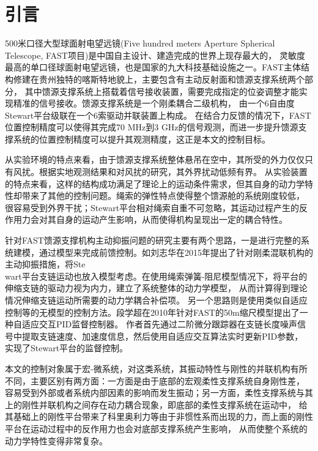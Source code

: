 \section{引言}

500米口径大型球面射电望远镜(Five hundred meters Aperture Spherical Telescope, FAST项目)是中国自主设计、建造完成的世界上现存最大的，
灵敏度最高的单口径球面射电望远镜，也是国家的九大科技基础设施之一。FAST主体结构修建在贵州独特的喀斯特地貌上，主要包含有主动反射面和馈源支撑系统两个部分，
其中馈源支撑系统上搭载着信号接收装置，需要完成指定的位姿调整才能实现精准的信号接收。馈源支撑系统是一个刚柔耦合二级机构，
由一个6自由度Stewart平台级联在一个6索驱动并联装置上构成\cite{pengFiveHundredMeterApertureSpherical2001}\cite{nanFiveHundredMeter2006}。
在结合力反馈的情况下，FAST位置控制精度可以使得其完成70 MHz到3 GHz的信号观测，而进一步提升馈源支撑系统的位置控制精度可以提升其观测精度，这正是本文的控制目标。

从实验环境的特点来看，由于馈源支撑系统整体悬吊在空中，其所受的外力仅仅只有风扰。根据实地观测结果和对风扰的研究，其外界扰动低频有界。
从实验装置的特点来看，这样的结构成功满足了理论上的运动条件需求，但其自身的动力学特性却带来了其他的控制问题。绳索的弹性特点使得整个馈源舱的系统刚度较低，
很容易受到外界干扰；Stewart平台相对绳索自重不可忽略，其运动过程产生的反作用力会对其自身的运动产生影响，从而使得机构呈现出一定的耦合特性。

针对FAST馈源支撑机构主动抑振问题的研究主要有两个思路，一是进行完整的系统建模，通过模型来完成前馈控制。如刘志华在2015年提出了针对刚柔混联机构的
主动抑振措施，将Ste\\wart平台支链运动也放入模型考虑。在使用绳索弹簧-阻尼模型情况下，将平台的伸缩支链的驱动力视为内力，建立了系统整体的动力学模型，
从而计算得到理论情况伸缩支链运动所需要的动力学耦合补偿项\cite{liuGangRouHunLianJiGouDeZhenDongTeXingJiYiZhenKongZhiYanJiu2015}。
另一个思路则是使用类似自适应控制等的无模型的控制方法。段学超在2010年针对FAST的50m缩尺模型提出了一种自适应交互PID监督控制器。
作者首先通过二阶微分跟踪器在支链长度噪声信号中提取支链速度、加速度信息，然后使用自适应交互算法实时更新PID参数，
实现了Stewart平台的监督控制\cite{duanRouXingZhiChengStewartPingTaiDeFenXiYouHuaYuKongZhiYanJiu2008}。

本文的控制对象属于宏-微系统，对这类系统，其振动特性与刚性的并联机构有所不同，主要区别有两方面：一方面是由于底部的宏观柔性支撑系统自身刚性差，
容易受到外部或者系统内部因素的影响而发生振动；另一方面，柔性支撑系统与其上的刚性并联机构之间存在动力耦合现象，即底部的柔性支撑系统在运动中，
给其基础上的刚性平台带来了科里奥利力等由于非惯性系而出现的力，而上面的刚性平台在运动过程中的反作用力也会对底部支撑系统产生影响，
从而使整个系统的动力学特性变得非常复杂。

